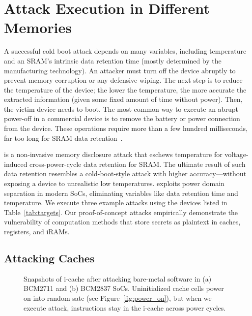 \section{Attack Execution in Different Memories}
\label{sec_attacks}

A successful cold boot attack depends on many variables, including temperature and an SRAM's intrinsic data retention time (mostly determined by the manufacturing technology).  
An attacker must turn off the device abruptly to prevent memory corruption or any defensive wiping. 
The next step is to reduce the temperature of the device; the lower the temperature, the more accurate the extracted information (given some fixed amount of time without power).
Then, the victim device needs to boot.
The most common way to execute an abrupt power-off in a commercial device is to remove the battery or power connection from the device. 
These operations require more than a few hundred milliseconds, far too long for SRAM data retention~\cite{anagnostopoulos2018low}. 

\sys{} is a non-invasive memory disclosure attack that eschews temperature for voltage-induced cross-power-cycle data retention for SRAM.
The ultimate result of such data retention resembles a cold-boot-style attack with higher accuracy---without exposing a device to unrealistic low temperatures. 
\sys{} exploits power domain separation in modern SoCs, eliminating variables like data retention time and temperature. 
We execute three example attacks using the devices listed in Table~\ref{tab:targets}.
Our proof-of-concept attacks empirically demonstrate the vulnerability of computation methods that store secrets as plaintext in caches, registers, and iRAMs.
    
\subsection{Attacking Caches}
\label{sub_sec_caches}
 \begin{figure}
    \centering
    \hfill
    
    \caption{  Snapshots of i-cache after attacking bare-metal software in (a) BCM2711 and (b) BCM2837 SoCs. Uninitialized cache cells power on into random sate (see Figure~\ref{fig:power_on}), but when we execute \sys{} attack, instructions stay in the i-cache across power cycles.}
    \label{fig:nops_i_cache} 
\end{figure}

